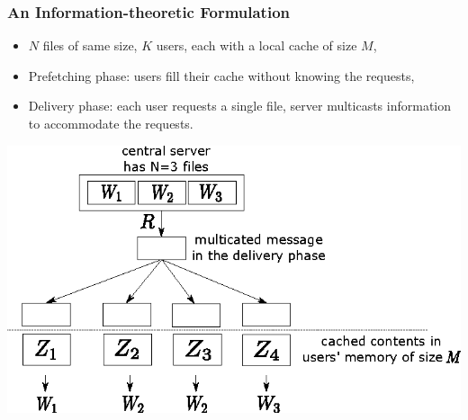 \documentclass{beamer}
\begin{document}
\begin{frame}
\frametitle{An Information-theoretic Formulation}
	\begin{itemize}
	\item $N$ files of same size, $K$ users, each with a local cache of size $M$,
	\item Prefetching phase: users fill their cache without knowing the requests,
	\item Delivery phase: each user requests a single file, server multicasts information to accommodate the requests.
	\end{itemize}
	\centering
	\includegraphics[scale = 0.3]{cacheNetwork.png}
\end{frame}
\end{document}
